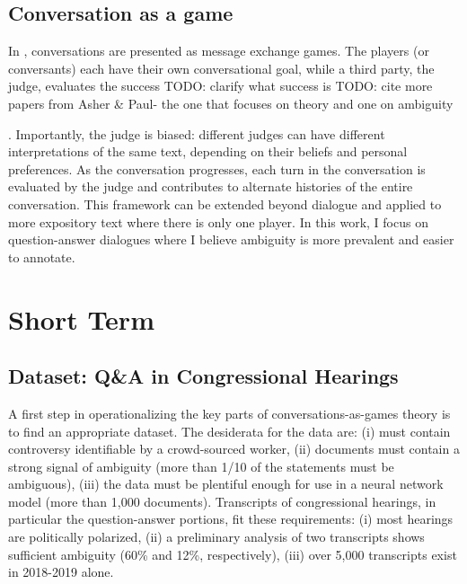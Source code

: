 \subsection{Conversation as a game} In \citet{Asher:2018}, conversations are presented as message exchange games. The players (or conversants) each have their own conversational goal, while a third party, the judge, evaluates the success 
TODO: clarify what success is
TODO: cite more papers from Asher \& Paul- the one that focuses on theory and one on ambiguity

. Importantly, the judge is biased: different judges can have different interpretations of the same text, depending on their beliefs and personal preferences. As the conversation progresses, each turn in the conversation is evaluated by the judge and contributes to alternate histories of the entire conversation. This framework can be extended beyond dialogue and applied to more expository text where there is only one player. In this work, I focus on question-answer dialogues where I believe ambiguity is more prevalent and easier to annotate. 

\section{Short Term}
\subsection{Dataset: Q\&A in Congressional Hearings}
A first step in operationalizing the key parts of conversations-as-games theory is to find an appropriate dataset. The desiderata for the data are: (i) must contain controversy identifiable by a crowd-sourced worker, (ii) documents must contain a strong signal of ambiguity (more than 1/10 of the statements must be ambiguous), (iii) the data must be plentiful enough for use in a neural network model (more than 1,000 documents). Transcripts of congressional hearings, in particular the question-answer portions, fit these requirements: (i) most hearings are politically polarized, (ii) a preliminary analysis of two transcripts shows sufficient ambiguity (60\% and 12\%, respectively), (iii) over 5,000 transcripts exist in 2018-2019 alone.

